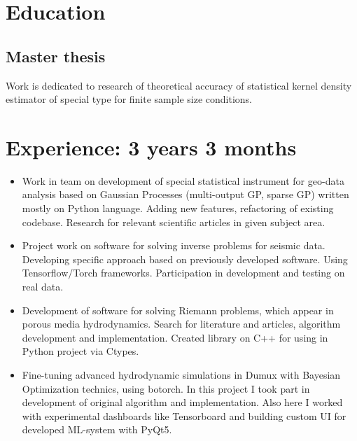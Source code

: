 \documentclass[12pt,a4paper]{moderncv}
\begin{document}
\makecvtitle
\section{Education}

\subsection{Master thesis}
Work is dedicated to research of theoretical accuracy of statistical kernel density estimator of special type for finite sample size conditions.

\section{Experience: 3 years 3 months}
\begin{itemize}
\item Work in team on development of special statistical instrument for geo-data analysis based on Gaussian Processes (multi-output GP, sparse GP) written mostly on Python language. Adding new features, refactoring of existing codebase. Research for relevant scientific articles in given subject area.\newline
\item Project work on software for solving inverse problems for seismic data. Developing specific approach based on previously developed software.
Using Tensorflow/Torch frameworks. Participation in development and testing on real data. \newline
\item Development of software for solving Riemann problems, which appear in porous media hydrodynamics.
Search for literature and articles, algorithm development and implementation. Created library on C++ for using in Python project via Ctypes. \newline
\item Fine-tuning advanced hydrodynamic simulations in Dumux with Bayesian Optimization technics, using botorch. In this project I took part in development of original algorithm and implementation. Also here I worked with experimental dashboards like Tensorboard and building custom UI for developed ML-system with PyQt5.
\end{itemize}
\end{document}
